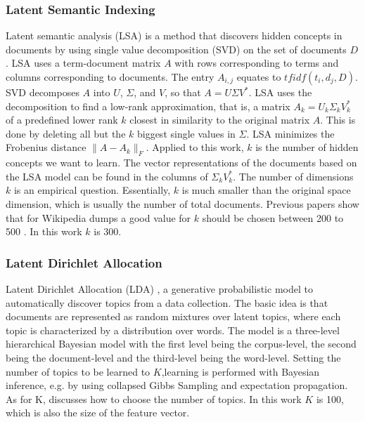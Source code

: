 \documentclass[a4paper]{article}
\begin{document}
\subsubsection{Latent Semantic Indexing}
Latent semantic analysis (LSA) \cite{deerwester1990indexing} is a method that discovers hidden concepts in documents by using single value decomposition (SVD) on the set of documents $D$.
LSA uses a term-document matrix $A$ with rows corresponding to terms and columns corresponding to documents. The entry $A_{i,j}$ equates to $tfidf(t_i, d_j, D)$. SVD decomposes $A$ into $U$, $\Sigma$, and $V$, so that $A = U \Sigma V^*$.
LSA uses the decomposition to find a low-rank approximation, that is, a matrix $A_k = U_k \Sigma_k V_k^*$ of a predefined lower rank $k$ closest in similarity to the original matrix $A$. This is done by deleting all but the $k$ biggest single values in $\Sigma$.
LSA minimizes the Frobenius distance $\|A-A_k\|_F$. Applied to this work, $k$ is the number of hidden concepts we want to learn. The vector representations of the documents based on the LSA model can be found in the columns of $\Sigma_k V_k^*$.
The number of dimensions $k$ is an empirical question. Essentially, $k$ is much smaller than the original space dimension, which is usually the number of total documents. Previous papers show that for Wikipedia dumps a good value for $k$ should be chosen between 200 to 500 \cite{bradford2008empirical}. In this work $k$ is 300.


\subsubsection{Latent Dirichlet Allocation}
Latent Dirichlet Allocation (LDA) \cite{blei2003latent}, a generative probabilistic model to automatically discover topics from a data collection.
The basic idea is that documents are represented as random mixtures over latent topics, where each topic is characterized by a distribution over words. The model is a three-level hierarchical Bayesian model with the first level being the corpus-level, the second being the document-level and the third-level being the word-level. Setting the number of topics to be learned to $K$,learning is performed with Bayesian inference, e.g. by using collapsed Gibbs Sampling and expectation propagation. As for K, \cite{hoffman2010online} discusses how to choose the number of topics. In this work $K$ is 100, which is also the size of the feature vector.
\end{document}
